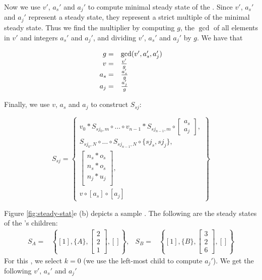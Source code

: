 Now we use $v'$, $a_s'$ and $a_j'$ to compute minimal steady state
of the {\splitjoin}.  Since $v'$, $a_s'$ and $a_j'$ represent a
steady state, they represent a strict multiple of the minimal
steady state.  Thus we find the multiplier by computing $g$, the
$\gcd$ of all elements in $v'$ and integers $a_s'$ and $a_j'$, and
dividing $v'$, $a_s'$ and $a_j'$ by $g$.  We have that

\begin{displaymath}
\begin{array}{rl}
g = & \gcd(v', a_s', a_j') \\
v = & v' \over g \\
a_s = &  a_s' \over g \\
a_j = & a_j' \over g
\end{array}
\end{displaymath}

Finally, we use $v$, $a_s$ and $a_j$ to construct $S_{sj}$:

\begin{displaymath}
S_{sj} = \left\{
\begin{array}{c}
v_0 * S_{sj_0,m} \circ \dots \circ v_{n-1} * S_{sj_{n-1}, m} \circ
\left[\begin{array}{c}a_s\\a_j\end{array}\right] , \\
S_{sj_0, N} \circ \dots \circ S_{sj_{n-1}, N} \circ \{sj_s,
sj_j\},
\\ \left[
\begin{array}{c}
n_s * o_{s} \\
n_s * o_{s} \\
n_j * u_{j} \\
\end{array}\right], \\
v \circ [a_s] \circ [a_j]
\end{array}\right\}
\end{displaymath}

Figure \ref{fig:steady-stat}e (b) depicts a sample {\splitjoin}.
The following are the steady states of the {\splitjoin}'s
children: $$
\begin{array}{lrlr} S_A = & \left\{[1], \{A\}, { \left[
\begin{array}{c} 2 \\ 2 \\ 1
\end{array}
\right]}, [] \right\}, & S_B = & \left\{[1], \{B\}, { \left[
\begin{array}{c} 3 \\ 2 \\ 6
\end{array}
\right]}, [] \right\}
\end{array}
$$ For this {\splitjoin}, we select $k = 0$ (we use the left-most child
to compute $a_j'$).  We get the following $v'$, $a_s'$ and $a_j'$


